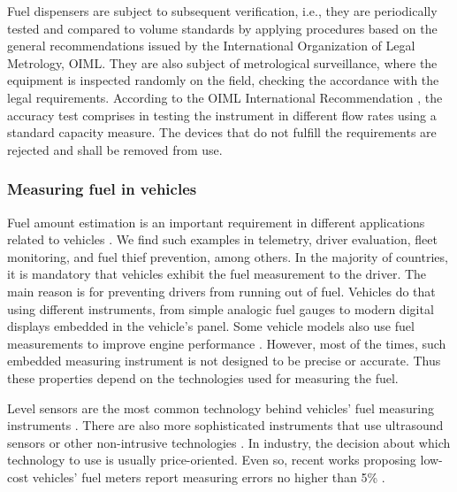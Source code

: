 \documentclass[sigplan]{acmart}
\begin{document}
Fuel dispensers are subject to subsequent verification, i.e., they are periodically tested and compared to volume standards by applying procedures based on the general recommendations issued by the International Organization of Legal Metrology, OIML. 
They are also subject of metrological surveillance, where the equipment is inspected randomly on the field, checking the accordance with the legal requirements.
According to the OIML International Recommendation \cite{OIML2007}, the accuracy test comprises in testing the instrument in different flow rates using a standard capacity measure.
The devices that do not fulfill the requirements are rejected and shall be removed from use.

\subsubsection{Measuring fuel in vehicles}
\label{s:vmftech}
Fuel amount estimation is an important requirement in different applications related to vehicles \cite{Skog2014,Obikoya2014,Andria2016,Kumar2017,Ahmed2017,Patil2017}.
We find such examples in telemetry, driver evaluation, fleet monitoring, and fuel thief prevention, among others.
In the majority of countries, it is mandatory that vehicles exhibit the fuel measurement to the driver.
The main reason is for preventing drivers from running out of fuel.
Vehicles do that using different instruments, from simple analogic fuel gauges to modern digital displays embedded in the vehicle's panel.
Some vehicle models also use fuel measurements to improve engine performance \cite{Skog2014}.
However, most of the times, such embedded measuring instrument is not designed to be precise or accurate.
Thus these properties depend on the technologies used for measuring the fuel.

Level sensors are the most common technology behind vehicles' fuel measuring instruments \cite{Obikoya2014}.
There are also more sophisticated instruments that use ultrasound sensors or other non-intrusive technologies \cite{Ahmed2017,Patil2017}.
In industry, the decision about which technology to use is usually price-oriented.
Even so, recent works proposing low-cost vehicles' fuel meters report measuring errors no higher than 5\% \cite{Obikoya2014,Ahmed2017,Kumar2017,Patil2017}.
\end{document}
